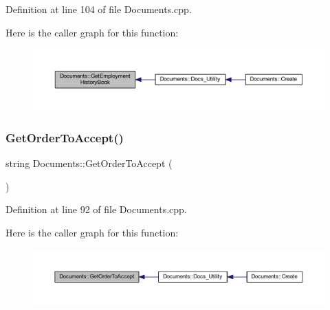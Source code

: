 Definition at line 104 of file Documents.\+cpp.

Here is the caller graph for this function\+:
\nopagebreak
\begin{figure}[H]
\begin{center}
\leavevmode
\includegraphics[width=350pt]{class_documents_a44b0e6798731de568258ff317c6700da_icgraph}
\end{center}
\end{figure}
\mbox{\label{class_documents_aac5573ba9b558530c669eccf178e3879}} 
\subsubsection{\texorpdfstring{Get\+Order\+To\+Accept()}{GetOrderToAccept()}}
{\footnotesize\ttfamily string Documents\+::\+Get\+Order\+To\+Accept (\begin{DoxyParamCaption}{ }\end{DoxyParamCaption})}



Definition at line 92 of file Documents.\+cpp.

Here is the caller graph for this function\+:
\nopagebreak
\begin{figure}[H]
\begin{center}
\leavevmode
\includegraphics[width=350pt]{class_documents_aac5573ba9b558530c669eccf178e3879_icgraph}
\end{center}
\end{figure}
\mbox{\label{class_documents_a47d56daa1f7434c712707bec1c827ea2}} 
